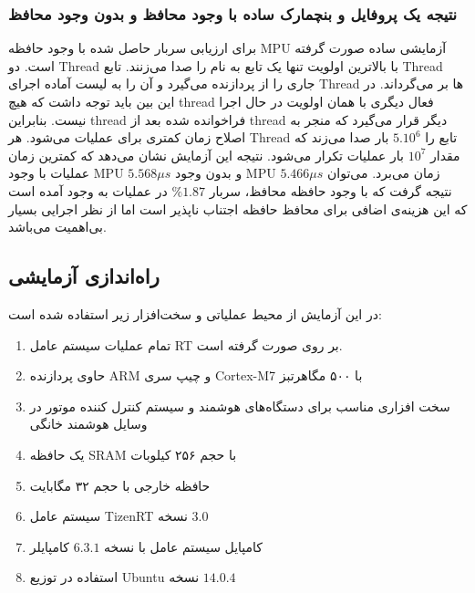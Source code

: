 \documentclass[10pt, a4paper]{article}
\begin{document}
\subsubsection{نتیجه یک پروفایل و بنچمارک ساده با وجود محافظ و بدون وجود محافظ}

برای ارزیابی سربار حاصل شده با وجود حافظه MPU آزمایشی ساده صورت گرفته است. دو
Thread با بالاترین اولویت تنها یک تابع به نام  را صدا
می‌زنند. تابع  Thread جاری را از پردازنده می‌گیرد و آن را به
لیست آماده اجرای Thread ها بر می‌گرداند. در این بین باید توجه داشت که هیچ thread
فعال دیگری با همان اولویت در حال اجرا نیست.  بنابراین thread فراخوانده شده بعد
از thread دیگر قرار می‌گیرد که منجر به اصلاح زمان کمتری برای عملیات  می‌شود. هر Thread تابع  را $5.10^6$ بار صدا می‌زند
که مقدار $10^7$ بار عملیات  تکرار می‌شود. نتیجه این آزمایش
نشان می‌دهد که کمترین زمان عملیات  با وجود MPU $5.568\mu s$ و
بدون وجود MPU $5.466\mu s$ زمان می‌برد. می‌توان نتیجه گرفت که با وجود حافظه
محافظ، سربار $\%1.87$ در عملیات  به وجود آمده است که این
هزینه‌ی اضافی برای محافظ حافظه اجتناب ناپذیر است اما از نظر اجرایی بسیار
بی‌اهمیت می‌باشد.

\subsection{راه‌اندازی آزمایشی}

در این آزمایش از محیط عملیاتی و سخت‌افزار زیر استفاده شده است:

\begin{enumerate}
    \item تمام عملیات سیستم عامل RT بر روی 
    \cite{armnxpimxrt1020} صورت گرفته است.
    \item حاوی پردازنده ARM و چیپ سری Cortex-M7 با ۵۰۰ مگاهرتبز
    \item سخت افزاری مناسب برای دستگاه‌های هوشمند و سیستم کنترل کننده موتور در
    وسایل هوشمند خانگی
    \item یک حافظه SRAM با حجم ۲۵۶ کیلوبات
    \item حافظه خارجی با حجم ۳۲ مگابایت 
    \item سیستم عامل TizenRT نسخه $3.0$ \cite{tizenrtrepo}
    \item کامپایل سیستم عامل با نسخه $6.3.1$ کامپایلر 
    \item استفاده در توزیع Ubuntu نسخه $14.0.4$
\end{enumerate}
\end{document}
